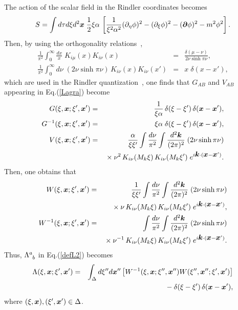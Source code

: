 The action of the scalar field in the Rindler coordinates
becomes
\begin{equation}
 S = \int d\tau d\xi d^2\mbox{\boldmath $x$}\;\frac{1}{2} 
    \xi \alpha\,\left[ \frac{1}{\xi^2\alpha^2}
   (\partial_\eta\phi)^2-(\partial_\xi\phi)^2
  -(\mbox{\boldmath $\partial$}\phi)^2-m^2\phi^2 \right].
\end{equation}
Then, by using the orthogonality relations~\cite{Erdely54},
\begin{eqnarray}
 \frac{1}{\pi^2}\int_0^{\infty}\frac{dx}{x}\;
   K_{i\mu}(x)K_{i\nu}(x)
   &=& \frac{\delta(\mu-\nu)}{2\nu\sinh\pi\nu}, \\
 \frac{1}{\pi^2}\int_0^{\infty}d\nu\;(2\nu\sinh\pi\nu)\,
   K_{i\nu}(x)K_{i\nu}(x')
   &=& x\;\delta(x-x'),
\label{ortho}
\end{eqnarray}
which are used in the Rindler quantization~\cite{Fullin73},
one finds that $G_{AB}$ and $V_{AB}$ appearing
in Eq.(\ref{Lagra}) become
\begin{eqnarray}
  G(\xi,\mbox{\boldmath $x$};\xi',\mbox{\boldmath $x$}')&=& \frac{1}{\xi\alpha}
     \,\delta(\xi-\xi')\,\delta(\mbox{\boldmath $x$}-\mbox{\boldmath $x$}'), \\
  G^{-1}(\xi,\mbox{\boldmath $x$};\xi',\mbox{\boldmath $x$}')   &=&
   \xi\alpha\;\delta(\xi-\xi')\,\delta(\mbox{\boldmath $x$}-\mbox{\boldmath $x$}'), \\
  V(\xi,\mbox{\boldmath $x$};\xi',\mbox{\boldmath $x$}')&=& \frac{\alpha}{\xi\xi'}
    \int\frac{d\nu}{\pi^2}
     \int \frac{d^2\mbox{\boldmath $k$}}{(2\pi)^2}
      \;(2\nu\sinh\pi\nu) \nonumber \\
    & & {}\times
    \nu^2\,K_{i\nu}(M_k\xi)\,K_{i\nu}(M_k\xi')
   \;e^{i\mbox{\boldmath $k$}\cdot (\mbox{\boldmath $x$}-\mbox{\boldmath $x$}')}.
\end{eqnarray}
Then, one obtains that
\begin{eqnarray}
  W(\xi,\mbox{\boldmath $x$};\xi',\mbox{\boldmath $x$}') &=&\frac{1}{\xi\xi'}
    \int\frac{d\nu}{\pi^2}
     \int \frac{d^2\mbox{\boldmath $k$}}{(2\pi)^2}
      \;(2\nu\sinh\pi\nu) \nonumber \\
    & & {}\times
    \nu \,K_{i\nu}(M_k\xi)\,K_{i\nu}(M_k\xi')
   \;e^{i\mbox{\boldmath $k$}\cdot (\mbox{\boldmath $x$}-\mbox{\boldmath $x$}')}, \\
  W^{-1}(\xi,\mbox{\boldmath $x$};\xi',\mbox{\boldmath $x$}')&=&
   \int\frac{d\nu}{\pi^2}
     \int \frac{d^2\mbox{\boldmath $k$}}{(2\pi)^2}
      \;(2\nu\sinh\pi\nu) \nonumber \\
    & & {}\times
      \nu^{-1} \,K_{i\nu}(M_k\xi)\,K_{i\nu}(M_k\xi')
   \;e^{i\mbox{\boldmath $k$}\cdot (\mbox{\boldmath $x$}-\mbox{\boldmath $x$}')}.
\end{eqnarray}
Thus, $\Lambda^a_{\sp b}$ in Eq.(\ref{defL2}) becomes
\begin{eqnarray}
  \Lambda(\xi,\mbox{\boldmath $x$};\xi',\mbox{\boldmath $x$}') &=& 
   \int_\Delta d\xi'' d\mbox{\boldmath $x$}'' 
    \left[ W^{-1}(\xi,\mbox{\boldmath $x$};\xi'',\mbox{\boldmath $x$}'')
    W(\xi'',\mbox{\boldmath $x$}'';\xi',\mbox{\boldmath $x$}')  \right]  \nonumber \\
    & & \qquad\qquad\qquad\qquad
  {}-\delta(\xi-\xi')\,\delta(\mbox{\boldmath $x$}-\mbox{\boldmath $x$}'),
\end{eqnarray}
where $(\xi,\mbox{\boldmath $x$}),(\xi',\mbox{\boldmath $x$}')\in \Delta$.

